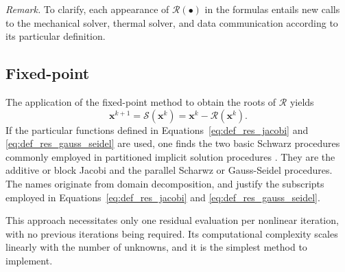 

     \smallskip
          \noindent \textit{Remark.} To clarify, each appearance of $\bm{\mathcal{R}}(\bullet)$ in the formulas entails new calls to the mechanical solver, thermal solver, and data communication according to its particular definition.
          \smallskip

          \subsection{Fixed-point} \label{sec:fixed_point_approach}

          The application of the fixed-point method to obtain the roots of \(\bm{\mathcal{R}}\) yields
          \begin{equation}
            \mathbf{x}^{k+1} = \bm{\mathcal{S}}(\mathbf{x}^k) = \mathbf{x}^k - \bm{\mathcal{R}}(\mathbf{x}^k).
          \end{equation}
          If the particular functions defined in Equations~\eqref{eq:def_res_jacobi} and \eqref{eq:def_res_gauss_seidel} are used, one finds the  two basic Schwarz procedures commonly employed in partitioned implicit solution procedures \citep{uekermann_parallel_2013, danowski_computational_2014, gatzhammer_efficient_2014}.
          They are the additive or block Jacobi and the parallel Scharwz or Gauss-Seidel procedures.
          The names originate from domain decomposition, and justify the subscripts employed in Equations~\eqref{eq:def_res_jacobi} and \eqref{eq:def_res_gauss_seidel}.

          This approach necessitates only one residual evaluation per nonlinear iteration, with no previous iterations being required.
          Its computational complexity scales linearly with the number of unknowns, and it is the simplest method to implement.

